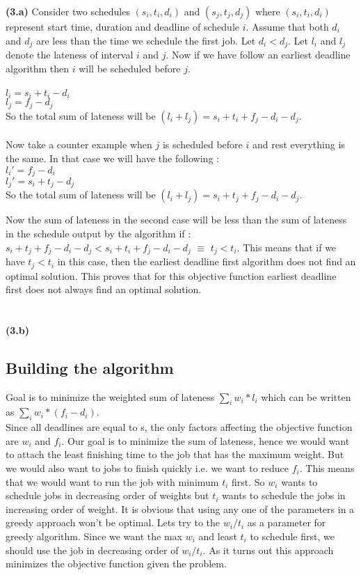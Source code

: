 \documentclass[12pt]{article}
\begin{document}
\textbf{(3.a)} Consider two schedules $(s_i, t_i, d_i)$ and $(s_j, t_j, d_j)$ where $(s_i, t_i, d_i)$ represent start time, duration and deadline of schedule $i$. Assume that both $d_i$ and $d_j$ are less than the time we schedule the first job. Let $d_i < d_j$. Let $l_i$ and $l_j$ denote the lateness of interval $i$ and $j$. Now if we have follow an earliest deadline algorithm then $i$ will be scheduled before $j$. \\\\
$l_i = s_i + t_i - d_i$\\
$l_j = f_j - d_j$ \\
So the total sum of lateness will be $(l_i + l_j) = s_i + t_i + f_j - d_i - d_j$.
\\\\
Now take a counter example when $j$ is scheduled before $i$ and rest everything is the same. In that case we will have the following :\\
$l_i' = f_j - d_i$\\
$l_j' = s_i + t_j - d_j$ \\
So the total sum of lateness will be $(l_i + l_j) = s_i + t_j + f_j - d_i - d_j$.
 
Now the sum of lateness in the second case will be less than the sum of lateness in the schedule output by the algorithm if :
$s_i + t_j + f_j - d_i - d_j < s_i + t_i + f_j - d_i - d_j$ $\equiv$ $t_j < t_i$. This means that if we have $t_j < t_i$ in this case, then the earliest deadline first algorithm does not find an optimal solution.
This proves that for this objective function earliest deadline first does not always find an optimal solution. 
\\\\\\
\textbf{(3.b)}
\subsection{Building the algorithm}
Goal is to minimize the weighted sum of lateness $\sum\limits_{i} w_i*l_i$ which can be written as $\sum\limits_{i} w_i*(f_i - d_i)$. \\Since all deadlines are equal to s, the only factors affecting the objective function are $w_i$ and $f_i$. Our goal is to minimize the sum of lateness, hence we would want to attach the least finishing time to the job that has the maximum weight. But we would also want to jobs to finish quickly i.e. we want to reduce $f_i$. This means that we would want to run the job with minimum $t_i$ first. So $w_i$ wants to schedule jobs in decreasing order of weights but $t_i$ wants to schedule the jobs in increasing order of weight. It is obvious that using any one of the parameters in a greedy approach won't be optimal. Lets try to the $w_i/ t_i$ as a parameter for greedy algorithm. Since we want the max $w_i$ and least $t_i$ to schedule first, we should use the job in decreasing order of $w_i/t_i$. As it turns out this approach minimizes the objective function given the problem.
\end{document}
